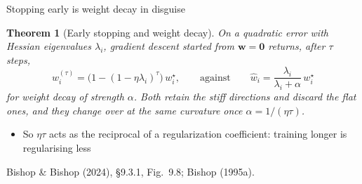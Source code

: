 \documentclass[aspectratio=169, 11pt]{beamer}
\newtheorem{thmx}[theorem]{Theorem}
\newcommand{\srcline}[1]{%
  \par\vspace{0.25em}%
  {\scriptsize\color{mcMuted}\hfill #1\par}}
\newcommand{\src}[3]{}      %
\begin{document}
\begin{frame}{Stopping early is weight decay in disguise}
  \src{bishop1995a}{equation}{12}
  \src{bishop1995a}{section}{2.3}
  \src{bishop2024}{equation}{9.56-9.61}
  \src{bishop2024}{section}{9.3.1}
  \src{bishop2024}{figure}{9.8}
  \vspace{-0.25em}
  \begin{thmx}[Early stopping and weight decay]\label{th:early}
    \small
    On a quadratic error with Hessian eigenvalues $\lambda_i$, gradient
    descent started from $\mathbf{w} = \mathbf{0}$ returns, after $\tau$ steps,
    \[
      w_i^{(\tau)} = \big(1 - (1-\eta\lambda_i)^{\tau}\big)\, w_i^\star ,
      \qquad\text{against}\qquad
      \hat w_i = \frac{\lambda_i}{\lambda_i + \alpha}\, w_i^\star
    \]
    for weight decay of strength $\alpha$. Both retain the stiff
    directions and discard the flat ones, and they change over at the
    same curvature once $\alpha = 1/(\eta\tau)$.
  \end{thmx}
  \vspace{0.25em}
  \begin{itemize}\itemsep0.26em
    \item So $\eta\tau$ acts as the reciprocal of a regularization
          coefficient: training longer is regularising less
  \end{itemize}
  \srcline{Bishop \& Bishop (2024), \S9.3.1, Fig.~9.8; Bishop (1995a).}
\end{frame}
\end{document}
